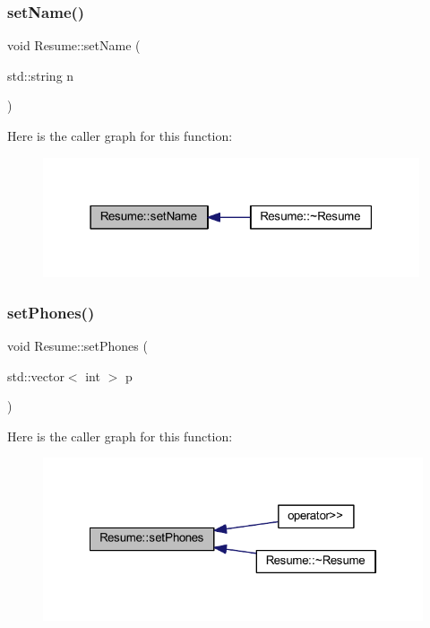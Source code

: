 \subsubsection{\texorpdfstring{set\+Name()}{setName()}}
{\footnotesize\ttfamily void Resume\+::set\+Name (\begin{DoxyParamCaption}\item[{std\+::string}]{n }\end{DoxyParamCaption})}

Here is the caller graph for this function\+:
\nopagebreak
\begin{figure}[H]
\begin{center}
\leavevmode
\includegraphics[width=315pt]{class_resume_a47a244bcf3498360be01b98c8773c847_icgraph}
\end{center}
\end{figure}
\hypertarget{class_resume_a97ea87081895f4319f72aec9a3f4fd1c}{}\label{class_resume_a97ea87081895f4319f72aec9a3f4fd1c} 
\subsubsection{\texorpdfstring{set\+Phones()}{setPhones()}}
{\footnotesize\ttfamily void Resume\+::set\+Phones (\begin{DoxyParamCaption}\item[{std\+::vector$<$ int $>$}]{p }\end{DoxyParamCaption})}

Here is the caller graph for this function\+:
\nopagebreak
\begin{figure}[H]
\begin{center}
\leavevmode
\includegraphics[width=322pt]{class_resume_a97ea87081895f4319f72aec9a3f4fd1c_icgraph}
\end{center}
\end{figure}



